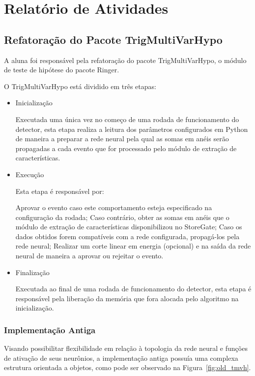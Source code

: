 \documentclass[a4paper,10pt,titlepage]{article}
\begin{document}
\section{Relatório de Atividades}

\subsection{Refatoração do Pacote TrigMultiVarHypo}

A aluna foi responsável pela refatoração do pacote TrigMultiVarHypo, o módulo de teste de hipótese do pacote Ringer.

O TrigMultiVarHypo está dividido em três etapas:

\begin{itemize}
 \item Inicialização

Executada uma única vez no começo de uma rodada de funcionamento do detector, esta etapa realiza a leitura dos parâmetros configurados em Python de maneira a preparar a rede neural pela qual as somas em anéis serão propagadas a cada evento que for processado pelo módulo de extração de características.

 \item Execução

Esta etapa é responsável por:

 \subitem Aprovar o evento caso este comportamento esteja especificado na configuração da rodada; 
 \subitem Caso contrário, obter as somas em anéis que o módulo de extração de características disponibilizou no StoreGate;
 \subitem Caso os dados obtidos forem compatíveis com a rede configurada, propagá-los pela rede neural;
 \subitem Realizar um corte linear em energia (opcional) e na saída da rede neural de maneira a aprovar ou rejeitar o evento.

 \item Finalização

Executada ao final de uma rodada de funcionamento do detector, esta etapa é responsável pela liberação da memória que fora alocada pelo algoritmo na inicialização.

\end{itemize}

\subsubsection{Implementação Antiga}

Visando possibilitar flexibilidade em relação à topologia da rede neural e funções de ativação de seus neurônios, a implementação antiga possuía uma complexa estrutura orientada a objetos, como pode ser observado na Figura~\ref{fig:old_tmvh}.
\end{document}
